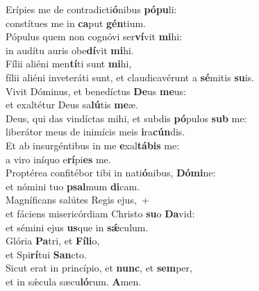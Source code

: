 \oddverse Erípies me de contradicti\textbf{ó}nibus \textbf{pó}\textbf{pu}li:~\*\\
\oddverse constítues me in \textbf{ca}put \textbf{gén}tium.\\
\evenverse Pópulus quem non cognóvi ser\textbf{ví}vit \textbf{mi}hi:~\*\\
\evenverse in audítu auris obe\textbf{dí}vit \textbf{mi}hi.\\
\oddverse Fílii aliéni men\textbf{tí}ti sunt \textbf{mi}hi,~\*\\
\oddverse fílii aliéni inveteráti sunt, et claudicavérunt a \textbf{sé}mitis \textbf{su}is.\\
\evenverse Vivit Dóminus, et benedíctus \textbf{De}us \textbf{me}us:~\*\\
\evenverse et exaltétur Deus sa\textbf{lú}tis \textbf{me}æ.\\
\oddverse Deus, qui das vindíctas mihi, et subdis \textbf{pó}pulos \textbf{sub} me:~\*\\
\oddverse liberátor meus de inimícis meis \textbf{i}ra\textbf{cún}dis.\\
\evenverse Et ab insurgéntibus in me \textbf{e}xal\textbf{tá}\textbf{bis} me:~\*\\
\evenverse a viro iníquo e\textbf{rí}pi\textbf{es} me.\\
\oddverse Proptérea confitébor tibi in nati\textbf{ó}nibus, \textbf{Dó}\textbf{mi}ne:~\*\\
\oddverse et nómini tuo \textbf{psal}mum \textbf{di}cam.\\
\evenverse Magníficans salútes Regis ejus,~+\\
\evenverse  et fáciens misericórdiam Christo \textbf{su}o \textbf{Da}vid:~\*\\
\evenverse et sémini ejus \textbf{us}que in \textbf{sǽ}culum.\\
\oddverse Glória \textbf{Pa}tri, et \textbf{Fí}\textbf{li}o,~\*\\
\oddverse et Spi\textbf{rí}tui \textbf{San}cto.\\
\evenverse Sicut erat in princípio, et \textbf{nunc}, et \textbf{sem}per,~\*\\
\evenverse et in sǽcula sæcu\textbf{ló}rum. \textbf{A}men.\\
